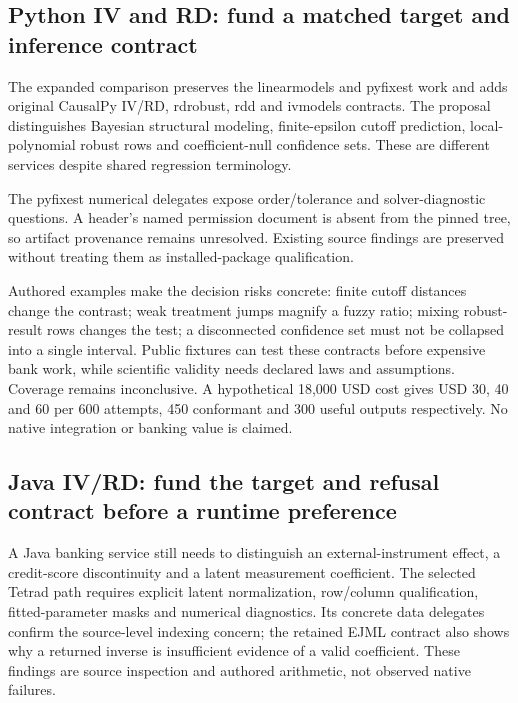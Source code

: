 \hypertarget{python-iv-and-rd-fund-a-matched-target-and-inference-contract}{%
\subsection{Python IV and RD: fund a matched target and inference
contract}\label{python-iv-and-rd-fund-a-matched-target-and-inference-contract}}

The expanded comparison preserves the linearmodels and pyfixest work and
adds original CausalPy IV/RD, rdrobust, rdd and ivmodels contracts. The
proposal distinguishes Bayesian structural modeling, finite-epsilon
cutoff prediction, local-polynomial robust rows and coefficient-null
confidence sets. These are different services despite shared regression
terminology.
\citep{exec25_pyrdiv_causalpy,exec25_pyrdiv_rdrobust,exec25_pyrdiv_rdd,exec25_pyrdiv_ivmodels}

The pyfixest numerical delegates expose order/tolerance and
solver-diagnostic questions. A header's named permission document is
absent from the pinned tree, so artifact provenance remains unresolved.
Existing source findings are preserved without treating them as
installed-package qualification. \citep{exec25_pyrdiv_pyfixest}

Authored examples make the decision risks concrete: finite cutoff
distances change the contrast; weak treatment jumps magnify a fuzzy
ratio; mixing robust-result rows changes the test; a disconnected
confidence set must not be collapsed into a single interval. Public
fixtures can test these contracts before expensive bank work, while
scientific validity needs declared laws and assumptions. Coverage
remains inconclusive. A hypothetical 18,000 USD cost gives USD 30, 40
and 60 per 600 attempts, 450 conformant and 300 useful outputs
respectively. No native integration or banking value is claimed.
\citep{exec25_pyrdiv_choice}

\hypertarget{java-ivrd-fund-the-target-and-refusal-contract-before-a-runtime-preference}{%
\subsection{Java IV/RD: fund the target and refusal contract before a
runtime
preference}\label{java-ivrd-fund-the-target-and-refusal-contract-before-a-runtime-preference}}

A Java banking service still needs to distinguish an external-instrument
effect, a credit-score discontinuity and a latent measurement
coefficient. The selected Tetrad path requires explicit latent
normalization, row/column qualification, fitted-parameter masks and
numerical diagnostics. Its concrete data delegates confirm the
source-level indexing concern; the retained EJML contract also shows why
a returned inverse is insufficient evidence of a valid coefficient.
These findings are source inspection and authored arithmetic, not
observed native failures.
\citep{exec25_javaiv_tetrad,exec25_javaiv_ejml}

